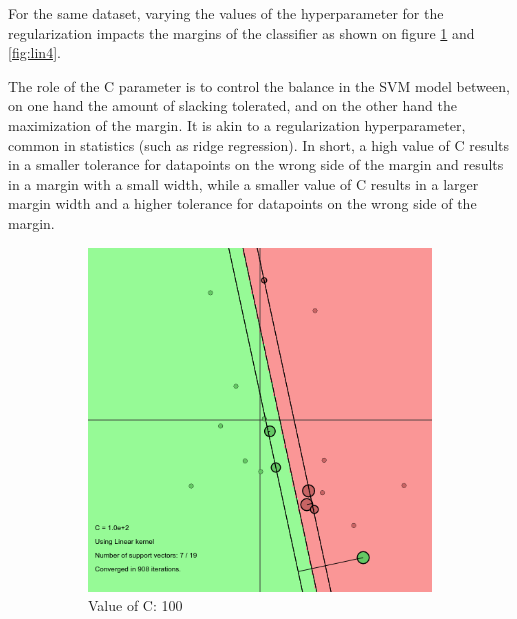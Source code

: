 \documentclass[11pt, a4paper]{article}
\begin{document}
For the same dataset, varying the values of the hyperparameter for the
regularization impacts the margins of the classifier as shown on
figure \ref{fig:lin3} and \ref{fig:lin4}.


The role of the C parameter is to control the balance in the SVM model
between, on one hand the amount of slacking tolerated, and on the other
hand the maximization of the margin. It is akin to a regularization
hyperparameter, common in statistics (such as ridge regression). In
short, a high value of C results in a smaller tolerance for datapoints
on the wrong side of the margin and results in a margin with a small
width, while a smaller value of C results in a larger margin width and
a higher tolerance for datapoints on the wrong side of the margin.

\begin{figure}[H]
    \centering
    \begin{subfigure}{.5\textwidth}
      \centering
      \includegraphics[width=0.9\linewidth]{1-2-1-linear_c_max.png}
      \caption{Value of C: 100}
      \label{fig:lin3}
    \end{subfigure}%
    \begin{subfigure}{.5\textwidth}
      \centering

\end{subfigure}
\end{figure}
\end{document}
